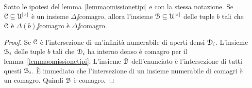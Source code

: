 \begin{corollary}
Sotto le ipotesi del lemma~\ref{lemmaomissionetipi} e con la stessa notazione. Se $\EuScript C\subseteq\EuScript U^{|x|}$ \`e un insieme $\Delta\jj$comagro, allora l'insieme $\EuScript B\subseteq\EuScript U^{|z|}$ delle tuple $b$ tali che $\EuScript C$ \`e $\Delta(b)\jj$comagro \`e $\Delta\jj$comagro.
\end{corollary}

\begin{proof} 
Se $\EuScript C$ \`e l'intersezione di un'infinit\`a numerabile di aperti-densi $\EuScript D_i$. L'insieme $\EuScript B_i$ delle tuple $b$ tali che  $\EuScript D_i$ ha interno denso \`e comagro per il lemma~\ref{lemmaomissionetipi}. L'insieme $\EuScript B$ dell'enunciato \`e l'intersezione di tutti questi $\EuScript B_i$. \`E immediato che l'intersezione di un insieme numerabile di comagri \`e un comagro. Quindi $\EuScript B$ \`e comagro.
\end{proof}









